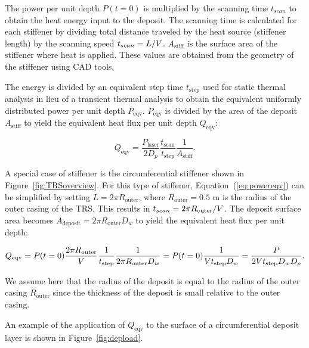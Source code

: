The power per unit depth $P(t=0)$ is multiplied by the scanning time $t_{scan}$ to obtain the heat energy input to the deposit. The scanning time is calculated for each stiffener by dividing total distance traveled by the heat source (stiffener length) by the scanning speed $t_{scan} = L/{\color{black}V}$. $A_{\textrm{stiff}}$ is the surface area of the stiffener where heat is applied. These values are obtained from the geometry of the stiffener using \ac{CAD} tools.

The energy is divided by an equivalent step time $t_{\textrm{step}}$ used for static thermal analysis in lieu of a transient thermal analysis to obtain the equivalent uniformly distributed power per unit depth $P_{\textrm{eqv}}$. $P_{\textrm{eqv}}$ is divided by the area of the deposit $A_{\textrm{stiff}}$ to yield the equivalent heat flux per unit depth $Q_{\textrm{eqv}}$:

\begin{equation}
	\label{eq:powereqv}
	Q_{\textrm{eqv}} = \dfrac{P_\textrm{laser}}{2D_{p}}\dfrac{t_{\textrm{scan}}}{t_{\textrm{step}}}\dfrac{1}{A_{\textrm{stiff}}}.
\end{equation}

A special case of stiffener is the circumferential stiffener shown in Figure~\ref{fig:TRSoverview}. For this type of stiffener, Equation~(\ref{eq:powereqv}) can be simplified by setting $L = 2\pi R_{\textrm{outer}}$, where $R_{\textrm{outer}} = 0.5$ m is the radius of the outer casing of the \ac{TRS}. This results in $t_{scan} = 2\pi R_{\textrm{outer}}/{\color{black}V}$. The deposit surface area becomes $A_{\textrm{deposit}} = 2\pi {R_{\textrm{outer}}}D_w$ to yield the equivalent heat flux per unit depth:

\begin{equation}
	\label{eq:powereqvcirc}
	Q_{\textrm{eqv}} = P(t=0)\dfrac{2\pi R_{\textrm{outer}}}{{\color{black}V}}\dfrac{1}{t_{\textrm{step}}}\dfrac{1}{2\pi {R_{\textrm{outer}}}D_w} = P(t=0)\dfrac{1}{{{\color{black}V}}t_{\textrm{step}}D_w} = \dfrac{{\color{black}P}}{{2{\color{black}V}}t_{\textrm{step}}D_wD_p}.
\end{equation}

We assume here that the radius of the deposit is equal to the radius of the outer casing $R_{\textrm{outer}}$ since the thickness of the deposit is small relative to the outer casing.

An example of the application of $Q_{\textrm{eqv}}$ to the surface of a circumferential deposit layer is shown in Figure~\ref{fig:depload}.

